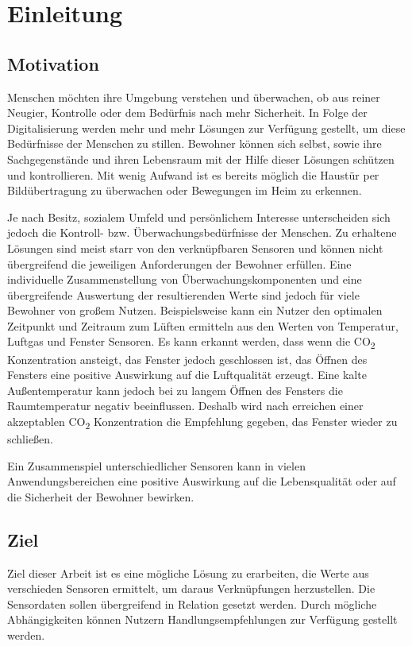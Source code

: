 \chapter{Einleitung}

\section{Motivation}
Menschen möchten ihre Umgebung verstehen und überwachen, ob aus reiner Neugier, Kontrolle oder dem Bedürfnis nach mehr Sicherheit.
In Folge der Digitalisierung werden mehr und mehr Lösungen zur Verfügung gestellt, um diese Bedürfnisse der Menschen zu stillen. Bewohner können sich selbst, sowie ihre Sachgegenstände und ihren Lebensraum mit der Hilfe dieser Lösungen schützen und kontrollieren. Mit wenig Aufwand ist es bereits möglich die Haustür per Bildübertragung zu überwachen oder Bewegungen im Heim zu erkennen.

Je nach Besitz, sozialem Umfeld und persönlichem Interesse unterscheiden sich jedoch die Kontroll- bzw. Überwachungsbedürfnisse der Menschen. Zu erhaltene Lösungen sind meist starr von den verknüpfbaren Sensoren und können nicht übergreifend die jeweiligen Anforderungen der Bewohner erfüllen.
Eine individuelle Zusammenstellung von Überwachungskomponenten und eine übergreifende Auswertung der resultierenden Werte sind jedoch für viele Bewohner von großem Nutzen. Beispielsweise kann ein Nutzer den optimalen Zeitpunkt und Zeitraum zum Lüften ermitteln aus den Werten von Temperatur, Luftgas und Fenster Sensoren. Es kann erkannt werden, dass wenn die CO\textsubscript{2} Konzentration ansteigt, das Fenster jedoch geschlossen ist, das Öffnen des Fensters eine positive Auswirkung auf die Luftqualität erzeugt. Eine kalte Außentemperatur kann jedoch bei zu langem Öffnen des Fensters die Raumtemperatur negativ beeinflussen. Deshalb wird nach erreichen einer akzeptablen CO\textsubscript{2} Konzentration die Empfehlung gegeben, das Fenster wieder zu schließen.

Ein Zusammenspiel unterschiedlicher Sensoren kann in vielen Anwendungsbereichen eine positive Auswirkung auf die Lebensqualität oder auf die Sicherheit der Bewohner bewirken.

\section{Ziel}
Ziel dieser Arbeit ist es eine mögliche Lösung zu erarbeiten, die Werte aus verschieden Sensoren ermittelt, um daraus Verknüpfungen herzustellen. Die Sensordaten sollen übergreifend in Relation gesetzt werden. Durch mögliche Abhängigkeiten können Nutzern Handlungsempfehlungen zur Verfügung gestellt werden.

